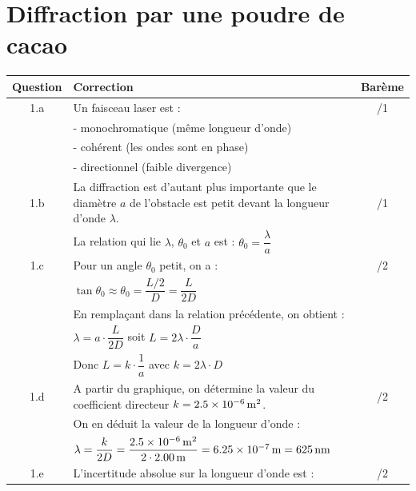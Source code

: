 \documentclass[a4paper,14pt,fleqn]{article}%
\begin{document}
\section{Diffraction par une poudre de cacao}
\begin{table}[h!]
    \begin{center}
        \begin{tabular}{|c|m{15cm}|c|}
            \hline
            Question & Correction & Barème \\
            \hline
            1.a & Un faisceau laser est : & /1\\
             & - monochromatique (même longueur d'onde) & \\
             & - cohérent (les ondes sont en phase) & \\
             & - directionnel (faible divergence) & \\
             \hline
            1.b & La diffraction est d'autant plus importante que le diamètre $a$ de l'obstacle est petit devant la longueur d'onde $\lambda$. & /1\\
             & La relation qui lie $\lambda$, $\theta_0$ et $a$ est : $\theta_0 = \dfrac{\lambda}{a} $ & \\
             \hline
            1.c & Pour un angle $\theta_0$ petit, on a : & /2\\
             & $\tan \theta_0 \approx \theta_0 = \dfrac{L/2}{D} = \dfrac{L}{2D}$ & \\
             & En remplaçant dans la relation précédente, on obtient : & \\
             & $\lambda = a \cdot \dfrac{L}{2D}$ soit $L = 2 \lambda \cdot \dfrac{D}{a}$ & \\
             & Donc $L = k \cdot \dfrac{1}{a}$ avec $k = 2 \lambda \cdot D$ & \\
             \hline
            1.d & A partir du graphique, on détermine la valeur du coefficient directeur $k = \SI{2,5E-6}{\meter\squared}$. & /2\\
             & On en déduit la valeur de la longueur d'onde : & \\
             & $\lambda = \dfrac{k}{2D} = \dfrac{\SI{2,5E-6}{\meter\squared}}{2 \cdot \SI{2,00}{\meter}} = \SI{6,25E-7}{\meter} = \SI{625}{nm}$ & \\
             \hline
            1.e & L'incertitude absolue sur la longueur d'onde est : & /2\\

\end{tabular}
\end{center}
\end{table}
\end{document}
